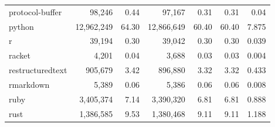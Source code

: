 \documentclass[10pt]{article} %
\begin{document}
\begin{table}[t]
{\begin{tabular}{@{\extracolsep{3pt}}lrrrrrr@{}}
protocol-buffer          & 98,246                                    & 0.44                                   & 97,167                                                 & 0.31                                                & 0.31                       & 0.04                           \\
python                   & 12,962,249                                & 64.30                                  & 12,866,649                                             & 60.40                                               & 60.40                      & 7.875                          \\
r                        & 39,194                                    & 0.30                                   & 39,042                                                 & 0.30                                                & 0.30                       & 0.039                          \\
racket                   & 4,201                                     & 0.04                                   & 3,688                                                  & 0.03                                                & 0.03                       & 0.004                          \\
restructuredtext         & 905,679                                   & 3.42                                   & 896,880                                                & 3.32                                                & 3.32                       & 0.433                          \\
rmarkdown                & 5,389                                     & 0.06                                   & 5,386                                                  & 0.06                                                & 0.06                       & 0.008                          \\
ruby                     & 3,405,374                                 & 7.14                                   & 3,390,320                                              & 6.81                                                & 6.81                       & 0.888                          \\
rust                     & 1,386,585                                 & 9.53                                   & 1,380,468                                              & 9.11                                                & 9.11                       & 1.188                          \\

\end{tabular}}
\end{table}
\end{document}
